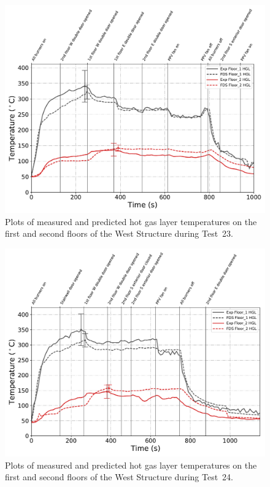 \begin{figure}[!h]
	\centering
	\includegraphics[width=\columnwidth]{Figures/Plots/Validation/Temperature/Test_23_HGL}
	\caption[Plots of measured and predicted hot gas layer temperatures during Test~23.]{Plots of measured and predicted hot gas layer temperatures on the first and second floors of the West Structure during Test~23.}
	\label{fig:HGL_data_Test23}
\end{figure}

\begin{figure}[!h]
	\centering
	\includegraphics[width=\columnwidth]{Figures/Plots/Validation/Temperature/Test_24_HGL}
	\caption[Plots of measured and predicted hot gas layer temperatures during Test~24.]{Plots of measured and predicted hot gas layer temperatures on the first and second floors of the West Structure during Test~24.}
	\label{fig:HGL_data_Test24}
\end{figure}

